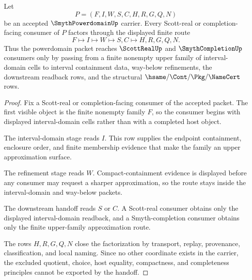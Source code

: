 \begin{theorem}
\label{thm:smyth-powerdomain-interval-domain-handoff}
Let
$$
P=(F,I,W,S,C,H,R,G,Q,N)
$$
be an accepted $\SmythPowerdomainUp$ carrier. Every Scott-real or completion-facing consumer of $P$ factors through the displayed finite route
$$
F \longmapsto I \longmapsto W \longmapsto S,C \longmapsto H,R,G,Q,N .
$$
Thus the powerdomain packet reaches $\ScottRealUp$ and $\SmythCompletionUp$ consumers only by passing from a finite nonempty upper family of interval-domain cells to interval containment data, way-below refinements, the downstream readback rows, and the structural $\hsame/\Cont/\Pkg/\NameCert$ rows.
\end{theorem}
\begin{proof}
Fix a Scott-real or completion-facing consumer of the accepted packet. The first visible object is the finite nonempty family $F$, so the consumer begins with displayed interval-domain cells rather than with a completed host object.

The interval-domain stage reads $I$. This row supplies the endpoint containment, enclosure order, and finite membership evidence that make the family an upper approximation surface.

The refinement stage reads $W$. Compact-containment evidence is displayed before any consumer may request a sharper approximation, so the route stays inside the interval-domain and way-below packets.

The downstream handoff reads $S$ or $C$. A Scott-real consumer obtains only the displayed interval-domain readback, and a Smyth-completion consumer obtains only the finite upper-family approximation route.

The rows $H,R,G,Q,N$ close the factorization by transport, replay, provenance, classification, and local naming. Since no other coordinate exists in the carrier, the excluded quotient, choice, host equality, compactness, and completeness principles cannot be exported by the handoff.
\end{proof}

